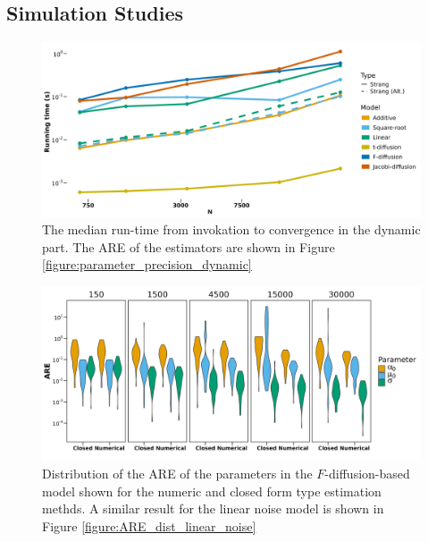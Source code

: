 \subsection{Simulation Studies}
\begin{figure}[h!]
    \begin{center}
    \includegraphics[scale = .1]{figures/estimation_duration_dynamic.jpeg}
    \caption{The median run-time from invokation to convergence in the dynamic part. The ARE of the estimators are shown in Figure \ref{figure:parameter_precision_dynamic}}
    \label{figure:estimation_duration_dynamic}
    \end{center}
\end{figure}

\begin{figure}[h!]
    \begin{center}
    \includegraphics[scale = .1]{figures/ARE_dist_result_plot_F.jpeg}
    \caption{Distribution of the ARE of the parameters in the $F$-diffusion-based model shown for the numeric and closed form type estimation methds. A similar result for the linear noise model is shown in Figure \ref{figure:ARE_dist_linear_noise}}
    \label{figure:ARE_dist_numeric_F_diffusion}
    \end{center}
\end{figure}

